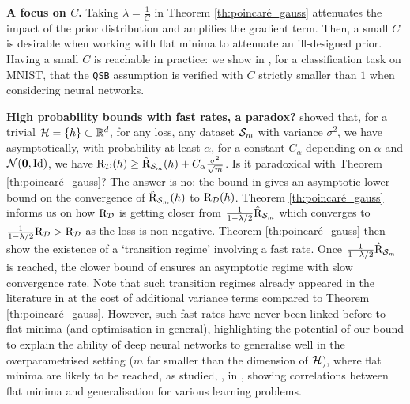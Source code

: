 \noindent\textbf{A focus on $C$.}
Taking $\lambda= \frac{1}{C}$ in Theorem \ref{th:poincaré_gauss} attenuates the impact of the prior distribution and amplifies the gradient term. Then, a small $C$ is desirable when working with flat minima to attenuate an ill-designed prior. Having a small $C$ is reachable in practice: we show in , for a classification task on MNIST, that the \texttt{QSB} assumption is verified with $C$ strictly smaller than $1$ when considering neural networks.
  
\noindent\textbf{High probability bounds with fast rates, a paradox?} \citet[page 7]{grunwald2021mac} showed that, for a trivial $\Hcal=\{h\}\subset \Rbb^d$, for any loss, any \iid dataset $\S_m$ with variance $\sigma^2$, we have asymptotically, with probability at least $\alpha$, for a constant $C_{\alpha}$ depending on $\alpha$ and $\Ncal(\zerobf,\textrm{Id})$, we have $\Risk_\D(h) \geq \hat{\Risk}_{\S_m}(h) + C_{\alpha}\frac{\sigma^2}{\sqrt{m}}$. Is it paradoxical with Theorem \ref{th:poincaré_gauss}? The answer is no: the bound in \citet{grunwald2021mac} gives an asymptotic lower bound on the convergence of $\hat{\Risk}_{\S_m}(h)$ to  $\Risk_\D(h)$. Theorem 
  \ref{th:poincaré_gauss} informs us on how $\Risk_\D$ is getting closer from $\frac{1}{1-\lambda/2}\hat{\Risk}_{\S_m}$ which converges to $\frac{1}{1-\lambda/2}\Risk_\D>\Risk_\D$ as the loss is non-negative.  
  Theorem \ref{th:poincaré_gauss} then show the existence of a `transition regime' involving a fast rate. Once  $\frac{1}{1-\lambda/2} \hat{\Risk}_{\S_m}$ is reached, the clower bound of \citet{grunwald2021mac} ensures an asymptotic regime with slow convergence rate. Note that such transition regimes already appeared in the literature in \citet{tolstikhin2013pac,mhammedi2019pac} at the cost of additional variance terms compared to Theorem \ref{th:poincaré_gauss}. However, such fast rates have never been linked before to flat minima (and optimisation in general), highlighting the potential of our bound to explain the ability of deep neural networks to generalise well in the overparametrised setting ($m$ far smaller than the dimension of $\Hcal$), where flat minima are likely to be reached, as studied, \eg, in \citet{dziugaite2020search}, showing correlations between flat minima and generalisation for various learning problems. 
  
